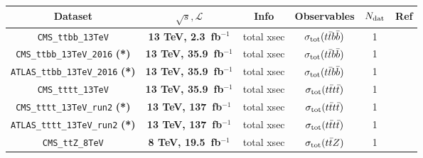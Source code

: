 \begin{table}[t]
  \centering
  \scriptsize
   \renewcommand{\arraystretch}{1.40}
  \begin{tabular}{c|c|c|c|c|c}
 Dataset   &  $\sqrt{s}, \mathcal{L}$ & Info  &  Observables  & $N_{\rm dat}$ & Ref   \\
    \toprule
 {\tt CMS\_ttbb\_13TeV}  & {\bf 13 TeV, 2.3~fb$^{-1}$}  & total xsec & $\sigma_{\rm tot}(t\bar{t}b\bar{b})$  &  1  &  \cite{Sirunyan:2017snr}  \\
\midrule
{\tt CMS\_ttbb\_13TeV\_2016}  {\bf (*)}  & {\bf 13 TeV, 35.9~fb$^{-1}$}  & total xsec & $\sigma_{\rm tot}(t\bar{t}b\bar{b})$  &  1  &  \cite{Sirunyan:2019jud}  \\
\midrule
{\tt ATLAS\_ttbb\_13TeV\_2016}  {\bf (*)}  & {\bf 13 TeV, 35.9~fb$^{-1}$}  & total xsec & $\sigma_{\rm tot}(t\bar{t}b\bar{b})$  &  1  &  \cite{Aaboud:2018eki}  \\
\midrule
 {\tt CMS\_tttt\_13TeV}  & {\bf 13 TeV, 35.9~fb$^{-1}$}  & total xsec & $\sigma_{\rm tot}(t\bar{t}t\bar{t})$  &  1  &  \cite{Sirunyan:2017roi}  \\
\midrule
 {\tt CMS\_tttt\_13TeV\_run2} {\bf (*)} & {\bf 13 TeV, 137~fb$^{-1}$}  & total xsec & $\sigma_{\rm tot}(t\bar{t}t\bar{t})$  &  1  &  \cite{Sirunyan:2019wxt}  \\
 \midrule
 {\tt ATLAS\_tttt\_13TeV\_run2} {\bf (*)} & {\bf 13 TeV, 137~fb$^{-1}$}  & total xsec & $\sigma_{\rm tot}(t\bar{t}t\bar{t})$  &  1  &  \cite{Aad:2020klt}  \\
\midrule
\midrule
  {\tt CMS\_ttZ\_8TeV}  & {\bf 8 TeV, 19.5~fb$^{-1}$}  & total xsec & $\sigma_{\rm tot}(t\bar{t}Z)$  &  1  &  \cite{Khachatryan:2015sha}  \\ \midrule

\end{tabular}
\end{table}
